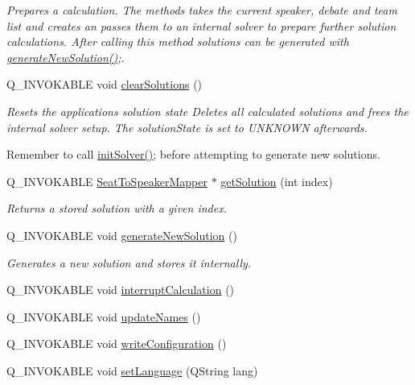 \begin{DoxyCompactItemize}
\begin{DoxyCompactList}\small\item\em Prepares a calculation. The methods takes the current speaker, debate and team list and creates an passes them to an internal solver to prepare further solution calculations. After calling this method solutions can be generated with \hyperlink{classMainModel_a0fca04016af7c3ff89f3d15693acc9a5}{generate\-New\-Solution()};. \end{DoxyCompactList}\item 
\hypertarget{classMainModel_a4b5886a2494b6f9c7ccdbb34ef37f1ae}{Q\-\_\-\-I\-N\-V\-O\-K\-A\-B\-L\-E void \hyperlink{classMainModel_a4b5886a2494b6f9c7ccdbb34ef37f1ae}{clear\-Solutions} ()}\label{classMainModel_a4b5886a2494b6f9c7ccdbb34ef37f1ae}

\begin{DoxyCompactList}\small\item\em Resets the applications solution state Deletes all calculated solutions and frees the internal solver setup. The solution\-State is set to U\-N\-K\-N\-O\-W\-N afterwards. \par
Remember to call \hyperlink{classMainModel_a99c4429479554c669311b860da91b2b8}{init\-Solver()}; before attempting to generate new solutions. \end{DoxyCompactList}\item 
\hypertarget{classMainModel_ac646fc37b0f65e6a8500477db7a2f7e6}{Q\-\_\-\-I\-N\-V\-O\-K\-A\-B\-L\-E \hyperlink{classSeatToSpeakerMapper}{Seat\-To\-Speaker\-Mapper} $\ast$ \hyperlink{classMainModel_ac646fc37b0f65e6a8500477db7a2f7e6}{get\-Solution} (int index)}\label{classMainModel_ac646fc37b0f65e6a8500477db7a2f7e6}

\begin{DoxyCompactList}\small\item\em Returns a stored solution with a given index. \end{DoxyCompactList}\item 
Q\-\_\-\-I\-N\-V\-O\-K\-A\-B\-L\-E void \hyperlink{classMainModel_a0fca04016af7c3ff89f3d15693acc9a5}{generate\-New\-Solution} ()
\begin{DoxyCompactList}\small\item\em Generates a new solution and stores it internally. \end{DoxyCompactList}\item 
Q\-\_\-\-I\-N\-V\-O\-K\-A\-B\-L\-E void \hyperlink{classMainModel_a1a00e342ab4f1c27429ca894aa7ed8d4}{interrupt\-Calculation} ()
\item 
Q\-\_\-\-I\-N\-V\-O\-K\-A\-B\-L\-E void \hyperlink{classMainModel_a0d65d53d33d977e4f5522327abddf232}{update\-Names} ()
\item 
Q\-\_\-\-I\-N\-V\-O\-K\-A\-B\-L\-E void \hyperlink{classMainModel_a91c905241023334ee91b97b69a14e87c}{write\-Configuration} ()
\item 
Q\-\_\-\-I\-N\-V\-O\-K\-A\-B\-L\-E void \hyperlink{classMainModel_a7711f1bb52f6427936653cccbcbbacf6}{set\-Language} (Q\-String lang)
\end{DoxyCompactItemize}
